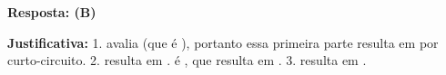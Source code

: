 \ifmostrarGabarito
\textbf{Resposta: (B)}

\textbf{Justificativa:}
1.  avalia  (que é ), portanto essa primeira parte resulta em  por curto-circuito.
2.  resulta em .  é , que resulta em .
3.  resulta em .

\fi
